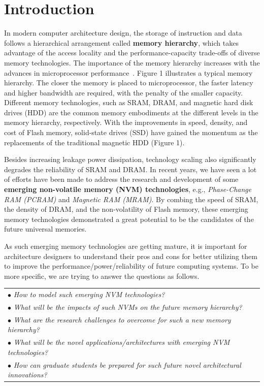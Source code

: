 \section{Introduction}

In modern computer architecture design, the storage of instruction and data
follows a hierarchical arrangement called \textbf{memory
hierarchy}, which takes advantage of the access locality and the performance-capacity trade-offs of
diverse memory technologies. The importance of the memory hierarchy
increases with the advances in microprocessor performance~\cite{ITRS07}.
Figure 1 illustrates a typical memory hierarchy. The closer the memory is placed to microprocessor,
the faster latency and higher bandwidth are required, with the penalty of the smaller capacity.
Different memory technologies, such as SRAM, DRAM, and magnetic hard disk drives (HDD) are
the common memory embodiments at the different levels in the memory hierarchy, respectively.
With the improvements in speed, density, and cost of Flash memory,
solid-state drives (SSD) have gained the momentum as the replacements
of the traditional magnetic HDD (Figure 1).

Besides increasing leakage power dissipation, technology scaling also significantly degrades
the reliability of SRAM and DRAM. In recent years, we have seen a lot of efforts have been made
to address the research and development of some
\textbf{emerging non-volatile memory (NVM) technologies}, e.g.,
\textit{Phase-Change RAM (PCRAM)} and \textit{Magnetic RAM (MRAM)}.
By combing the speed of SRAM, the density of DRAM, and the
non-volatility of Flash memory, these emerging memory technologies demonstrated
a great potential to be the candidates of the future universal memories.



As such emerging memory technologies are getting mature, it is important for architecture
designers to understand their pros and cons for better utilizing them to improve
the performance/power/reliability of future computing systems.
To be more specific, we are trying to answer the questions as follows.

 \vspace{5pt}
\begin{tabular}{|l|}
\hline
  $\bullet$ \textit{How to model such emerging NVM technologies?} \\
  $\bullet$ \textit{What will be the impacts of such NVMs on the future memory hierarchy?}\\
 $\bullet$ \textit{What are the research challenges to overcome for such a new memory hierarchy?} \\
 $\bullet$ \textit{What will be the novel applications/architectures with emerging NVM technologies?} \\
$\bullet$ \textit{How can graduate students be prepared for such future novel architectural innovations?}  \\
\hline
\end{tabular} \vspace{5pt}

